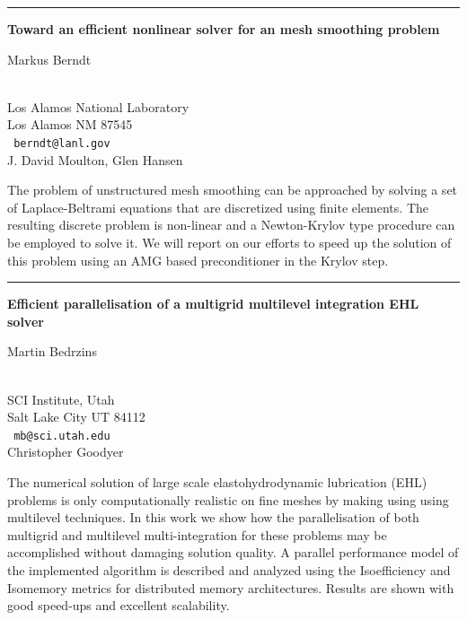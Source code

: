 \documentclass[twosided]{report}
\begin{document}
\begin{center}

\rule{6in}{1pt}
\end{center}

\begin{center}
{\large			\label{berndt}
{\bf
Toward an efficient nonlinear solver for an mesh smoothing problem
}

Markus Berndt} \\
Los Alamos National Laboratory
\\
Los Alamos NM 87545
\\ {\tt
berndt@lanl.gov
}
\\
J. David Moulton, Glen Hansen
\end{center}

The problem of unstructured mesh smoothing can be approached by solving
a set of Laplace-Beltrami equations that are discretized using finite
elements. The resulting discrete problem is non-linear and a
Newton-Krylov type procedure can be employed to solve it. We will
report on our efforts to speed up the solution of this problem using an
AMG based preconditioner in the Krylov step.

\begin{center}

\rule{6in}{1pt}
\end{center}

\begin{center}
{\large			\label{bedrzins}
{\bf
Efficient parallelisation of a multigrid multilevel integration EHL
solver
}

Martin Bedrzins} \\
SCI Institute, Utah
\\
Salt Lake City UT 84112
\\ {\tt
mb@sci.utah.edu
}
\\
Christopher Goodyer
\end{center}

The numerical solution of large scale elastohydrodynamic lubrication
(EHL) problems is only computationally realistic on fine meshes by
making using using multilevel techniques.  In this work we show how the
parallelisation of both multigrid and multilevel multi-integration for
these problems may be accomplished without damaging solution quality.
A parallel performance model of the implemented algorithm is described
and analyzed using the Isoefficiency and Isomemory metrics for
distributed memory architectures.  Results are shown with good
speed-ups and excellent scalability.
\end{document}
